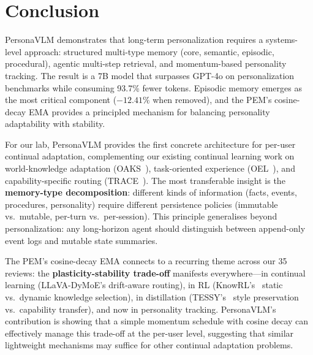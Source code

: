 \documentclass[11pt]{article}
\begin{document}
\section{Conclusion}

PersonaVLM demonstrates that long-term personalization requires a systems-level approach: structured multi-type memory (core, semantic, episodic, procedural), agentic multi-step retrieval, and momentum-based personality tracking. The result is a 7B model that surpasses GPT-4o on personalization benchmarks while consuming 93.7\% fewer tokens. Episodic memory emerges as the most critical component ($-12.41\%$ when removed), and the PEM's cosine-decay EMA provides a principled mechanism for balancing personality adaptability with stability.

For our lab, PersonaVLM provides the first concrete architecture for per-user continual adaptation, complementing our existing continual learning work on world-knowledge adaptation (OAKS~\cite{oaks}), task-oriented experience (OEL~\cite{oel}), and capability-specific routing (TRACE~\cite{trace}). The most transferable insight is the \textbf{memory-type decomposition}: different kinds of information (facts, events, procedures, personality) require different persistence policies (immutable vs.\ mutable, per-turn vs.\ per-session). This principle generalises beyond personalization: any long-horizon agent should distinguish between append-only event logs and mutable state summaries.

The PEM's cosine-decay EMA connects to a recurring theme across our 35 reviews: the \textbf{plasticity-stability trade-off} manifests everywhere---in continual learning (LLaVA-DyMoE's drift-aware routing), in RL (KnowRL's~\cite{knowrl} static vs.\ dynamic knowledge selection), in distillation (TESSY's~\cite{tessy} style preservation vs.\ capability transfer), and now in personality tracking. PersonaVLM's contribution is showing that a simple momentum schedule with cosine decay can effectively manage this trade-off at the per-user level, suggesting that similar lightweight mechanisms may suffice for other continual adaptation problems.
\end{document}
